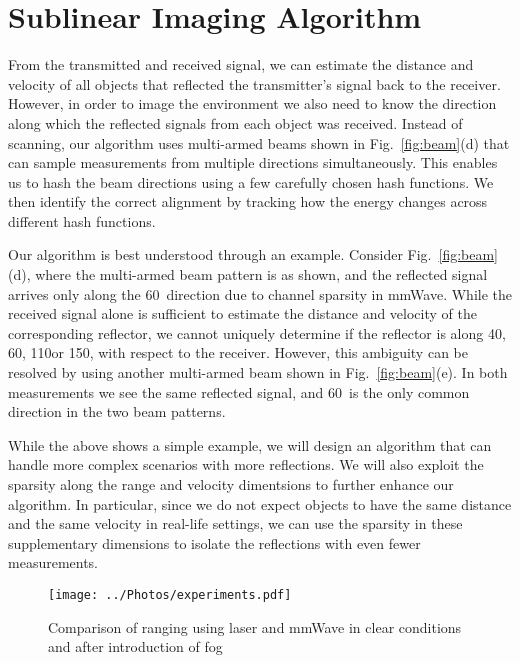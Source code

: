 
\vspace{-3mm}
\section{Sublinear Imaging Algorithm }


From the transmitted and received signal, we can estimate the distance and
velocity of all objects that reflected the transmitter's signal back to the
receiver. However, in order to image the environment we also need to know the
direction along which the reflected signals from each object was received. 
Instead of scanning, our algorithm uses multi-armed beams shown in  Fig.~\ref{fig:beam}(d) 
that can sample measurements from multiple directions simultaneously. This enables us
to hash the beam directions using a few carefully chosen hash functions. 
We then identify the correct alignment by tracking how the energy
changes across different hash functions.

Our algorithm is best understood through an example. Consider
Fig.~\ref{fig:beam}(d), where the multi-armed beam pattern is as shown, and the
reflected signal arrives only along the 60\textdegree ~direction due to channel
sparsity in mmWave. While the received signal alone is sufficient to estimate
the distance and velocity of the corresponding reflector, we cannot uniquely
determine if the reflector is along 40\textdegree, 60\textdegree,
110\textdegree or 150\textdegree, with respect to the receiver. However, this
ambiguity can be resolved by using another multi-armed beam shown in
Fig.~\ref{fig:beam}(e).  In both measurements we see the same reflected signal,
and 60\textdegree ~is the only common direction in the two beam patterns. 

While the above shows a simple example, we will design an algorithm that can
handle more complex scenarios with more reflections. We will also 
exploit the sparsity along the range and velocity dimentsions to further enhance our algorithm. 
In particular, since we do not expect objects to have the same distance and the same velocity in 
real-life settings, we can use the sparsity in these supplementary dimensions to 
isolate the reflections with even fewer measurements.

\begin{figure*}
	\centering
	\texttt{[image: ../Photos/experiments.pdf]}
	\caption{\footnotesize{Comparison of ranging using laser and mmWave in clear conditions and after introduction of fog}}
	\label{fig:expt_setup}
\end{figure*}



